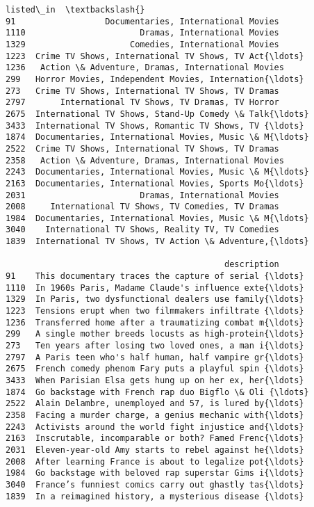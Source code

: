 \documentclass[11pt]{article}
\begin{document}
\begin{tcolorbox}[breakable, size=fbox, boxrule=.5pt, pad at break*=1mm, opacityfill=0]
\begin{Verbatim}[commandchars=\\\{\}]
                                              listed\_in  \textbackslash{}
91                  Documentaries, International Movies
1110                       Dramas, International Movies
1329                     Comedies, International Movies
1223  Crime TV Shows, International TV Shows, TV Act{\ldots}
1236   Action \& Adventure, Dramas, International Movies
299   Horror Movies, Independent Movies, Internation{\ldots}
273   Crime TV Shows, International TV Shows, TV Dramas
2797       International TV Shows, TV Dramas, TV Horror
2675  International TV Shows, Stand-Up Comedy \& Talk{\ldots}
3433  International TV Shows, Romantic TV Shows, TV {\ldots}
1874  Documentaries, International Movies, Music \& M{\ldots}
2522  Crime TV Shows, International TV Shows, TV Dramas
2358   Action \& Adventure, Dramas, International Movies
2243  Documentaries, International Movies, Music \& M{\ldots}
2163  Documentaries, International Movies, Sports Mo{\ldots}
2031                       Dramas, International Movies
2008     International TV Shows, TV Comedies, TV Dramas
1984  Documentaries, International Movies, Music \& M{\ldots}
3040    International TV Shows, Reality TV, TV Comedies
1839  International TV Shows, TV Action \& Adventure,{\ldots}

                                            description
91    This documentary traces the capture of serial {\ldots}
1110  In 1960s Paris, Madame Claude's influence exte{\ldots}
1329  In Paris, two dysfunctional dealers use family{\ldots}
1223  Tensions erupt when two filmmakers infiltrate {\ldots}
1236  Transferred home after a traumatizing combat m{\ldots}
299   A single mother breeds locusts as high-protein{\ldots}
273   Ten years after losing two loved ones, a man i{\ldots}
2797  A Paris teen who's half human, half vampire gr{\ldots}
2675  French comedy phenom Fary puts a playful spin {\ldots}
3433  When Parisian Elsa gets hung up on her ex, her{\ldots}
1874  Go backstage with French rap duo Bigflo \& Oli {\ldots}
2522  Alain Delambre, unemployed and 57, is lured by{\ldots}
2358  Facing a murder charge, a genius mechanic with{\ldots}
2243  Activists around the world fight injustice and{\ldots}
2163  Inscrutable, incomparable or both? Famed Frenc{\ldots}
2031  Eleven-year-old Amy starts to rebel against he{\ldots}
2008  After learning France is about to legalize pot{\ldots}
1984  Go backstage with beloved rap superstar Gims i{\ldots}
3040  France’s funniest comics carry out ghastly tas{\ldots}
1839  In a reimagined history, a mysterious disease {\ldots}
\end{Verbatim}
\end{tcolorbox}
        
\end{document}
